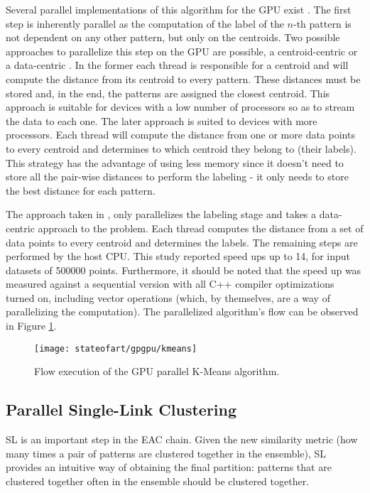 Several parallel implementations of this algorithm for the GPU exist \cite{Zechner2009,Bai2009,Wu2011,Sirotkovi2012,Farivar2008}.
The first step is inherently parallel as the computation of the label of the $n$-th pattern is not dependent on any other pattern, but only on the centroids.
Two possible approaches to parallelize this step on the GPU are possible, a centroid-centric or a data-centric \cite{Bai2009}.
In the former each thread is responsible for a centroid and will compute the distance from its centroid to every pattern.
These distances must be stored and, in the end, the patterns are assigned the closest centroid.
This approach is suitable for devices with a low number of processors so as to stream the data to each one.
The later approach is suited to devices with more processors.
Each thread will compute the distance from one or more data points to every centroid and determines to which centroid they belong to (their labels).
This strategy has the advantage of using less memory since it doesn't need to store all the pair-wise distances to perform the labeling - it only needs to store the best distance for each pattern.

The approach taken in \cite{Zechner2009b}, only parallelizes the labeling stage and takes a data-centric approach to the problem.
Each thread computes the distance from a set of data points to every centroid and determines the labels.
The remaining steps are performed by the host CPU.
This study reported speed ups up to 14, for input datasets of 500000 points.
Furthermore, it should be noted that the speed up was measured against a sequential version with all C++ compiler optimizations turned on, including vector operations (which, by themselves, are a way of parallelizing the computation).
The parallelized algorithm's flow can be observed in Figure \ref{fig:kmeans}.

\begin{figure}[hbtp]
\centering
\texttt{[image: stateofart/gpgpu/kmeans]}
\caption{Flow execution of the GPU parallel K-Means algorithm.}
\label{fig:kmeans}
\end{figure}

\subsection{Parallel Single-Link Clustering}

SL is an important step in the EAC chain.
Given the new similarity metric (how many times a pair of patterns are clustered together in the ensemble), SL provides an intuitive way of obtaining the final partition: patterns that are clustered together often in the ensemble should be clustered together.

